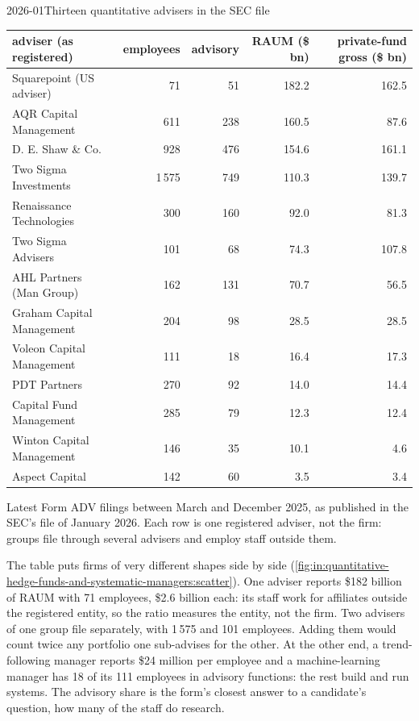 \begin{dated}{2026-01}{Thirteen quantitative advisers in the SEC file}\label{dat:in:quantitative-hedge-funds-and-systematic-managers:named}
\small
\begin{tabular}{@{}lrrrr@{}}
\toprule
adviser (as registered) & employees & advisory & RAUM (\$ bn) & private-fund gross (\$ bn)\\
\midrule
Squarepoint (US adviser) & 71 & 51 & 182.2 & 162.5\\
AQR Capital Management & 611 & 238 & 160.5 & 87.6\\
D. E. Shaw \& Co. & 928 & 476 & 154.6 & 161.1\\
Two Sigma Investments & 1\,575 & 749 & 110.3 & 139.7\\
Renaissance Technologies & 300 & 160 & 92.0 & 81.3\\
Two Sigma Advisers & 101 & 68 & 74.3 & 107.8\\
AHL Partners (Man Group) & 162 & 131 & 70.7 & 56.5\\
Graham Capital Management & 204 & 98 & 28.5 & 28.5\\
Voleon Capital Management & 111 & 18 & 16.4 & 17.3\\
PDT Partners & 270 & 92 & 14.0 & 14.4\\
Capital Fund Management & 285 & 79 & 12.3 & 12.4\\
Winton Capital Management & 146 & 35 & 10.1 & 4.6\\
Aspect Capital & 142 & 60 & 3.5 & 3.4\\
\bottomrule
\end{tabular}

\smallskip\noindent Latest Form ADV filings between March and December 2025, as published in the SEC's file of January
2026. Each row is one registered adviser, not the firm: groups file through several advisers and employ staff outside
them.
\end{dated}

The table puts firms of very different shapes side by side
(\cref{fig:in:quantitative-hedge-funds-and-systematic-managers:scatter}). One adviser reports \$182 billion of RAUM with
71 employees, \$2.6 billion each: its staff work for affiliates outside the registered entity, so the ratio measures the
entity, not the firm. Two advisers of one group file separately, with 1\,575 and 101 employees. Adding them would count
twice any portfolio one sub-advises for the other. At the other end, a trend-following manager reports \$24 million per
employee and a machine-learning manager has 18 of its 111 employees in advisory functions: the rest build and run
systems. The advisory share is the form's closest answer to a candidate's question, how many of the staff do research.

